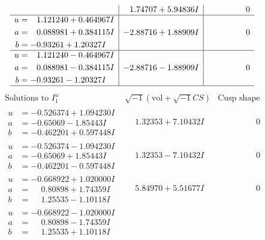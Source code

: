 \documentclass[1p]{elsarticle_modified}
\theoremstyle{definition}
\newcommand{\I}{\sqrt{-1}}
\begin{document}
$$\begin{array}{c|c|c}
 & \phantom{-}1.74707 + 5.94836 I & \phantom{-0.000000 } 0 \\ \hline\begin{aligned}
u &= \phantom{-}1.121240 + 0.464967 I \\
a &= \phantom{-}0.088981 + 0.384115 I \\
b &= -0.93261 + 1.20327 I\end{aligned}
 & -2.88716 + 1.88909 I & \phantom{-0.000000 } 0 \\ \hline\begin{aligned}
u &= \phantom{-}1.121240 - 0.464967 I \\
a &= \phantom{-}0.088981 - 0.384115 I \\
b &= -0.93261 - 1.20327 I\end{aligned}
 & -2.88716 - 1.88909 I & \phantom{-0.000000 } 0\\
 \hline 
 \end{array}$$\newpage$$\begin{array}{c|c|c}  
\text{Solutions to }I^u_{1}& \I (\text{vol} + \sqrt{-1}CS) & \text{Cusp shape}\\
 \hline 
\begin{aligned}
u &= -0.526374 + 1.094230 I \\
a &= -0.65069 - 1.85443 I \\
b &= -0.462201 + 0.597448 I\end{aligned}
 & \phantom{-}1.32353 + 7.10432 I & \phantom{-0.000000 } 0 \\ \hline\begin{aligned}
u &= -0.526374 - 1.094230 I \\
a &= -0.65069 + 1.85443 I \\
b &= -0.462201 - 0.597448 I\end{aligned}
 & \phantom{-}1.32353 - 7.10432 I & \phantom{-0.000000 } 0 \\ \hline\begin{aligned}
u &= -0.668922 + 1.020000 I \\
a &= \phantom{-}0.80898 + 1.74359 I \\
b &= \phantom{-}1.25535 - 1.10118 I\end{aligned}
 & \phantom{-}5.84970 + 5.51677 I & \phantom{-0.000000 } 0 \\ \hline\begin{aligned}
u &= -0.668922 - 1.020000 I \\
a &= \phantom{-}0.80898 - 1.74359 I \\
b &= \phantom{-}1.25535 + 1.10118 I\end{aligned}

\end{array}$$
\end{document}
